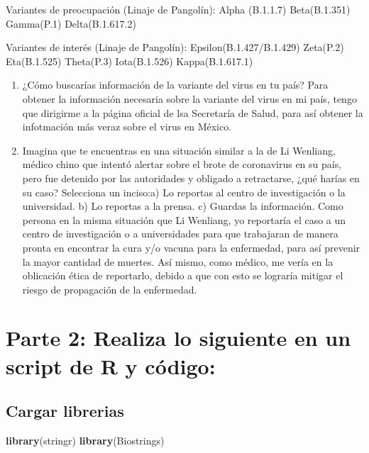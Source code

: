\documentclass[
]{article}
\newenvironment{Shaded}{\begin{snugshade}}{\end{snugshade}}
\newcommand{\FunctionTok}[1]{\textcolor[rgb]{0.13,0.29,0.53}{\textbf{#1}}}
\newcommand{\NormalTok}[1]{#1}
\begin{document}
Variantes de preocupación (Linaje de Pangolín): Alpha (B.1.1.7)
Beta(B.1.351) Gamma(P.1) Delta(B.1.617.2)

Variantes de interés (Linaje de Pangolín): Epsilon(B.1.427/B.1.429)
Zeta(P.2) Eta(B.1.525) Theta(P.3) Iota(B.1.526) Kappa(B.1.617.1)

\begin{enumerate}
\def\labelenumi{\arabic{enumi}.}
\setcounter{enumi}{3}
\item
  ¿Cómo buscarías información de la variante del virus en tu país? Para
  obtener la información necesaria sobre la variante del virus en mi
  país, tengo que dirigirme a la página oficial de lsa Secretaría de
  Salud, para así obtener la infotmación más veraz sobre el virus en
  México.
\item
  Imagina que te encuentras en una situación similar a la de Li
  Wenliang, médico chino que intentó alertar sobre el brote de
  coronavirus en su país, pero fue detenido por las autoridades y
  obligado a retractarse, ¿qué harías en su caso? Selecciona un
  inciso:a) Lo reportas al centro de investigación o la universidad. b)
  Lo reportas a la prensa. c) Guardas la información. Como persona en la
  misma situación que Li Wenliang, yo reportaría el caso a un centro de
  investigación o a universidades para que trabajaran de manera pronta
  en encontrar la cura y/o vacuna para la enfermedad, para así prevenir
  la mayor cantidad de muertes. Así mismo, como médico, me vería en la
  oblicación ética de reportarlo, debido a que con esto se lograría
  mitigar el riesgo de propagación de la enfermedad.
\end{enumerate}

\hypertarget{parte-2-realiza-lo-siguiente-en-un-script-de-r-y-cuxf3digo}{%
\section{Parte 2: Realiza lo siguiente en un script de R y
código:}\label{parte-2-realiza-lo-siguiente-en-un-script-de-r-y-cuxf3digo}}

\hypertarget{cargar-librerias}{%
\subsection{Cargar librerias}\label{cargar-librerias}}

\begin{Shaded}
\begin{Highlighting}[]
\FunctionTok{library}\NormalTok{(stringr)}
\FunctionTok{library}\NormalTok{(Biostrings)}
\end{Highlighting}
\end{Shaded}
\end{document}

